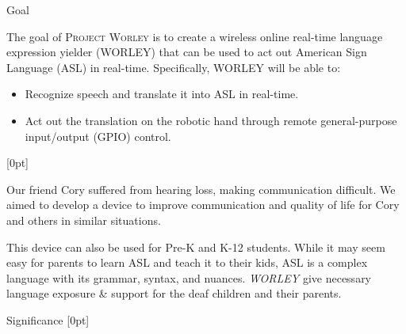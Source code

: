 \documentclass[final, 20pt]{beamer}
\newlength{\colwidth}
\begin{document}
\begin{frame}[t]
\begin{columns}[t]
    \separatorcolumn

    \begin{column}{\colwidth}
      \begin{block}{Goal}

        The goal of \textsc{Project Worley} is to create a wireless online real-time language expression yielder (WORLEY) that can be used to act out American Sign Language (ASL) in real-time. Specifically, WORLEY will be able to:

        \begin{itemize}
          \item Recognize speech and translate it into ASL in real-time.
          \item Act out the translation on the robotic hand through remote general-purpose input/output (GPIO) control.
        \end{itemize}

        [0pt]

        Our friend Cory suffered from hearing loss, making communication difficult. We aimed to develop a device to improve communication and quality of life for Cory and others in similar situations.

        This device can also be used for Pre-K and K-12 students.  While it may seem easy for parents to learn ASL and teach it to their kids, ASL is a complex language with its grammar, syntax, and nuances. \emph{WORLEY} give necessary language exposure \& support for the deaf children and their parents.
      \end{block}

      \begin{block}{Significance}
        [0pt]


\end{block}
\end{column}
\end{columns}
\end{frame}
\end{document}
